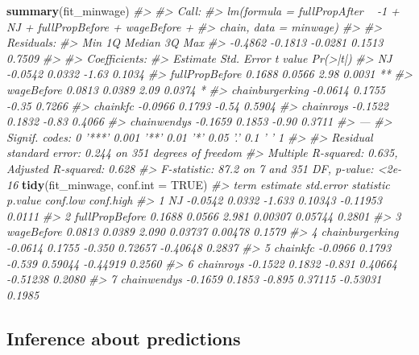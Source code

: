 \documentclass[]{book}
\newenvironment{Shaded}{\begin{snugshade}}{\end{snugshade}}
\newcommand{\CommentTok}[1]{\textcolor[rgb]{0.56,0.35,0.01}{\textit{#1}}}
\newcommand{\DataTypeTok}[1]{\textcolor[rgb]{0.13,0.29,0.53}{#1}}
\newcommand{\KeywordTok}[1]{\textcolor[rgb]{0.13,0.29,0.53}{\textbf{#1}}}
\newcommand{\NormalTok}[1]{#1}
\newcommand{\OtherTok}[1]{\textcolor[rgb]{0.56,0.35,0.01}{#1}}
\theoremstyle{definition}
\theoremstyle{definition}
\theoremstyle{definition}
\theoremstyle{remark}
\begin{document}
\begin{Shaded}
\begin{Highlighting}[]
\KeywordTok{summary}\NormalTok{(fit_minwage)}
\CommentTok{#> }
\CommentTok{#> Call:}
\CommentTok{#> lm(formula = fullPropAfter ~ -1 + NJ + fullPropBefore + wageBefore + }
\CommentTok{#>     chain, data = minwage)}
\CommentTok{#> }
\CommentTok{#> Residuals:}
\CommentTok{#>     Min      1Q  Median      3Q     Max }
\CommentTok{#> -0.4862 -0.1813 -0.0281  0.1513  0.7509 }
\CommentTok{#> }
\CommentTok{#> Coefficients:}
\CommentTok{#>                 Estimate Std. Error t value Pr(>|t|)   }
\CommentTok{#> NJ               -0.0542     0.0332   -1.63   0.1034   }
\CommentTok{#> fullPropBefore    0.1688     0.0566    2.98   0.0031 **}
\CommentTok{#> wageBefore        0.0813     0.0389    2.09   0.0374 * }
\CommentTok{#> chainburgerking  -0.0614     0.1755   -0.35   0.7266   }
\CommentTok{#> chainkfc         -0.0966     0.1793   -0.54   0.5904   }
\CommentTok{#> chainroys        -0.1522     0.1832   -0.83   0.4066   }
\CommentTok{#> chainwendys      -0.1659     0.1853   -0.90   0.3711   }
\CommentTok{#> ---}
\CommentTok{#> Signif. codes:  0 '***' 0.001 '**' 0.01 '*' 0.05 '.' 0.1 ' ' 1}
\CommentTok{#> }
\CommentTok{#> Residual standard error: 0.244 on 351 degrees of freedom}
\CommentTok{#> Multiple R-squared:  0.635,  Adjusted R-squared:  0.628 }
\CommentTok{#> F-statistic: 87.2 on 7 and 351 DF,  p-value: <2e-16}
\KeywordTok{tidy}\NormalTok{(fit_minwage, }\DataTypeTok{conf.int =} \OtherTok{TRUE}\NormalTok{)}
\CommentTok{#>              term estimate std.error statistic p.value conf.low conf.high}
\CommentTok{#> 1              NJ  -0.0542    0.0332    -1.633 0.10343 -0.11953    0.0111}
\CommentTok{#> 2  fullPropBefore   0.1688    0.0566     2.981 0.00307  0.05744    0.2801}
\CommentTok{#> 3      wageBefore   0.0813    0.0389     2.090 0.03737  0.00478    0.1579}
\CommentTok{#> 4 chainburgerking  -0.0614    0.1755    -0.350 0.72657 -0.40648    0.2837}
\CommentTok{#> 5        chainkfc  -0.0966    0.1793    -0.539 0.59044 -0.44919    0.2560}
\CommentTok{#> 6       chainroys  -0.1522    0.1832    -0.831 0.40664 -0.51238    0.2080}
\CommentTok{#> 7     chainwendys  -0.1659    0.1853    -0.895 0.37115 -0.53031    0.1985}
\end{Highlighting}
\end{Shaded}

\hypertarget{inference-about-predictions}{%
\subsection{Inference about
predictions}\label{inference-about-predictions}}
\end{document}
